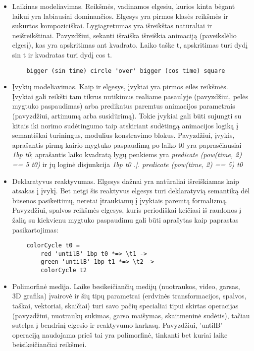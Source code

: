 \begin{itemize}

	\item Laikinas modeliavimas. Reikšmės, vadinamos elgesiu, kurios kinta bėgant laikui yra labiausiai dominančios. Elgesys yra pirmos klasės reikšmės ir sukurtos kompoziciškai. Lygiagretumas yra išreikštas natūraliai ir neišreikštinai. Pavyzdžiui, sekanti išraiška išreiškia animaciją (paveikslėlio elgesį), kas yra apskritimas ant kvadrato. Laiko taške t, apskritimas turi dydį sin t ir kvadratas turi dydį cos t.

\begin{lstlisting}
	bigger (sin time) circle 'over' bigger (cos time) square
\end{lstlisting}

	\item Įvykių modeliavimas. Kaip ir elgesys, įvykiai yra pirmos eilės reikšmės. Įvykiai gali reikšti tam tikrus nutikimus realiame pasaulyje (pavyzdžiui, pelės mygtuko paspaudimas) arba predikatus paremtus animacijos parametrais (pavyzdžiui, artimumą arba susidūrimą). Tokie įvykiai gali būti sujungti su kitais iki norimo sudėtingumo taip atskiriant sudėtingą animacijos logiką į semantiškai turiningus, modulius konstravimo blokus. Pavyzdžiui, įvykis, aprašantis pirmą kairio mygtuko paspaudimą po laiko t0 yra paprasčiausiai \textit{1bp t0}; aprašantis laiko kvadratą lygų penkiems yra \textit{predicate (pow(time, 2) == 5 t0)} ir jų loginė disjunkcija \textit{1bp t0 .|. predicate (pow(time, 2) == 5) t0}

	\item Deklaratyvus reaktyvumas. Elgesys dažnai yra natūraliai išreiškiamas kaip atsakas į įvykį. Bet netgi šis reaktyvus elgesys turi deklaratyvią semantiką dėl būsenos pasikeitimų, neretai įtraukiamų į įvykiais paremtą formalizmą. Pavyzdžiui, spalvos reikšmės elgesys, kuris periodiškai keičiasi iš raudonos į žalią su kiekvienu mygtuko paspaudimu gali būti aprašytas kaip paprastas pasikartojimas:

\begin{lstlisting}
	colorCycle t0 =
		red 'untilB' 1bp t0 *=> \t1 ->
		green 'untilB' 1bp t1 *=> \t2 ->
		colorCycle t2
\end{lstlisting}

	\item Polimorfinė medija. Laike besikeičiančių medijų (nuotraukos, video, garsas, 3D grafika) įvairovė ir šių tipų parametrai (erdvinės transformacijos, spalvos, taškai, vektoriai, skaičiai) turi savo pačių specialiai tipui skirtas operacijas (pavyzdžiui, nuotraukų sukimas, garso maišymas, skaitmeninė sudėtis), tačiau sutelpa į bendrinį elgesio ir reaktyvumo karkasą. Pavyzdžiui, 'untilB' operaciją naudojama prieš tai yra polimorfinė, tinkanti bet kuriai laike beisikeičiančiai reikšmei.

\end{itemize}


